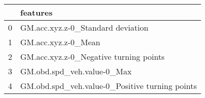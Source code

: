 \begin{tabular}{ll}
\toprule
{} &                                        features \\
\midrule
0 &               GM.acc.xyz.z-0\_Standard deviation \\
1 &                             GM.acc.xyz.z-0\_Mean \\
2 &          GM.acc.xyz.z-0\_Negative turning points \\
3 &                      GM.obd.spd\_veh.value-0\_Max \\
4 &  GM.obd.spd\_veh.value-0\_Positive turning points \\
\bottomrule
\end{tabular}
